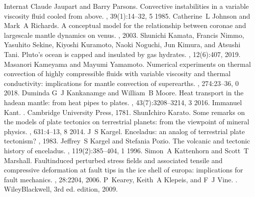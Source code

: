 \documentclass[letterpaper,10pt,english]{jupyterBook}
\begin{document}
\begin{sphinxthebibliography}{Internat}
\sphinxAtStartPar
Claude Jaupart and Barry Parsons. Convective instabilities in a variable viscosity fluid cooled from above. , 39(1):14–32, 5 1985.
\sphinxAtStartPar
Catherine L Johnson and Mark A Richards. A conceptual model for the relationship between coronae and large\sphinxhyphen{}scale mantle dynamics on venus. , 2003.
\sphinxAtStartPar
Shunichi Kamata, Francis Nimmo, Yasuhito Sekine, Kiyoshi Kuramoto, Naoki Noguchi, Jun Kimura, and Atsushi Tani. Pluto's ocean is capped and insulated by gas hydrates. , 12(6):407, 2019.
\sphinxAtStartPar
Masanori Kameyama and Mayumi Yamamoto. Numerical experiments on thermal convection of highly compressible fluids with variable viscosity and thermal conductivity: implications for mantle convection of super\sphinxhyphen{}earths. , 274:23–36, 0 2018.
\sphinxAtStartPar
Duminda G J Kankanamge and William B Moore. Heat transport in the hadean mantle: from heat pipes to plates. , 43(7):3208–3214, 3 2016.
\sphinxAtStartPar
Immanuel Kant. . Cambridge University Press, 1781.
\sphinxAtStartPar
Shun\sphinxhyphen{}Ichiro Karato. Some remarks on the models of plate tectonics on terrestrial planets: from the view\sphinxhyphen{}point of mineral physics. , 631:4–13, 8 2014.
\sphinxAtStartPar
J S Kargel. Enceladus: an analog of terrestrial plate tectonism? , 1983.
\sphinxAtStartPar
Jeffrey S Kargel and Stefania Pozio. The volcanic and tectonic history of enceladus. , 119(2):385–404, 1 1996.
\sphinxAtStartPar
Simon A Kattenhorn and Scott T Marshall. Fault\sphinxhyphen{}induced perturbed stress fields and associated tensile and compressive deformation at fault tips in the ice shell of europa: implications for fault mechanics. , 28:2204, 2006.
\sphinxAtStartPar
P Kearey, Keith A Klepeis, and F J Vine. . Wiley\sphinxhyphen{}Blackwell, 3rd ed. edition, 2009.

\end{sphinxthebibliography}
\end{document}

